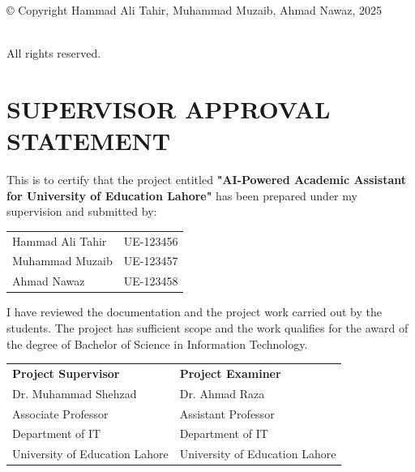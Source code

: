 \documentclass[12pt,a4paper]{book}
\numberwithin{table}{chapter}
\numberwithin{figure}{chapter}
\numberwithin{equation}{chapter}
\begin{document}
\thispagestyle{empty}
\strut\vfill
\begin{center}

© Copyright Hammad Ali Tahir, Muhammad Muzaib, Ahmad Nawaz, 2025

~\\[4\baselineskip]
All rights reserved.

\end{center}
\vfill\strut
\clearpage

\pagestyle{plain}
\cleardoublepage
{}

\chapter*{SUPERVISOR APPROVAL STATEMENT}

\bigskip
\bigskip

This is to certify that the project entitled \textbf{"AI-Powered Academic Assistant for University of Education Lahore"} has been prepared under my supervision and submitted by:

\bigskip
\begin{tabular}{l l}
Hammad Ali Tahir & UE-123456\\
Muhammad Muzaib & UE-123457\\
Ahmad Nawaz & UE-123458
\end{tabular}

\bigskip
I have reviewed the documentation and the project work carried out by the students. The project has sufficient scope and the work qualifies for the award of the degree of Bachelor of Science in Information Technology.

\bigskip\bigskip
\bigskip

\begin{tabular}{p{3in} p{3in}}
\textbf{Project Supervisor} & \textbf{Project Examiner}\\[2\baselineskip]
Dr. Muhammad Shehzad & Dr. Ahmad Raza\\
Associate Professor & Assistant Professor\\
Department of IT & Department of IT\\
University of Education Lahore & University of Education Lahore
\end{tabular}
\end{document}
